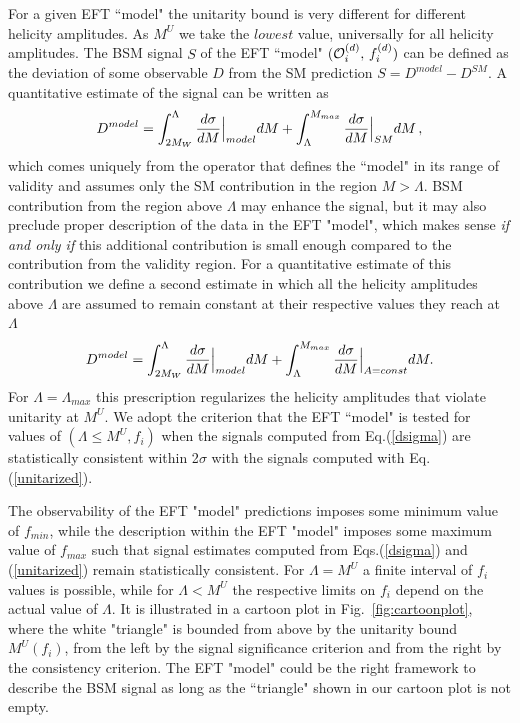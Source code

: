 \documentclass[../report.tex]{subfiles}
\begin{document}
For a given EFT ``model" the unitarity bound is very different for  different helicity amplitudes.
As  $M^U$ we take  the $lowest$ value, universally for all helicity 
amplitudes. 
The BSM signal  $S$ of the EFT ``model" $({\cal O}_i^{(d)},\,f_i^{(d)})$ 
can be defined as the deviation of some observable $D$ from the SM prediction 
$S=D^{model}-D^{SM}$.
A quantitative estimate of the signal can be written as
\small
\begin{equation} 
D^{model}=\int^{\Lambda}_{2M_W}\frac{d\sigma}{dM} \Bigl|_{model} dM +\int_{\Lambda}^{M_{max}}\frac{d\sigma}{dM}\Bigr|_{SM} dM\,,
\label{dsigma}
\end{equation}
\normalsize
which comes uniquely from the operator that defines the ``model" in its range
of validity and assumes only the SM contribution in the region $M>\Lambda$.
BSM contribution from the region above $\Lambda$   may enhance the signal, but it may also 
preclude proper description of the data in the EFT  "model",
which makes sense {\it if and only if} this additional contribution is small enough  
compared to the contribution from the validity region.  
For a  quantitative estimate of this 
contribution we define a second estimate in which  all the helicity amplitudes above 
$\Lambda$ are assumed to remain 
constant at their respective values they reach at $\Lambda$
\small
\begin{equation}
D^{model}=\int^{\Lambda}_{2M_W}\frac{d\sigma}{dM}\Bigl|_{model} dM +\int_{\Lambda}^{M_{max}}\frac{d\sigma}{dM}\Bigr|_{A=const} dM.
\label{unitarized}
\end{equation}
\normalsize
For $\Lambda = \Lambda_{max}$ this prescription regularizes the helicity amplitudes that violate unitarity at $M^U$. 
We adopt the criterion that the EFT ``model" is tested for values of $(\Lambda\leq M^U, f_i)$ 
when the signals computed from Eq.(\ref{dsigma}) are statistically consistent 
within 2$\sigma$ with the signals computed with Eq.(\ref{unitarized}).

The observability of  the EFT "model" predictions imposes some minimum value of $f_{min}$, while the description within the EFT "model" imposes some 
maximum value of $f_{max}$ such that signal
estimates computed from Eqs.(\ref{dsigma}) and (\ref{unitarized}) remain 
statistically consistent.  
For $\Lambda=M^U$ a finite interval of $f_i$ values is possible, while 
for $\Lambda <M^U$ the  respective limits on $f_i$  depend on the actual value of $\Lambda$. It is illustrated in 
a cartoon plot in Fig.~\ref{fig:cartoonplot}, where the white "triangle" is bounded from 
above by the unitarity bound $M^U(f_i)$, from the left by the signal significance criterion 
and from the right by the consistency criterion.
The EFT "model" could be the right framework to describe the  BSM signal as long as the ``triangle"
shown in our cartoon plot is not empty.  
\end{document}
